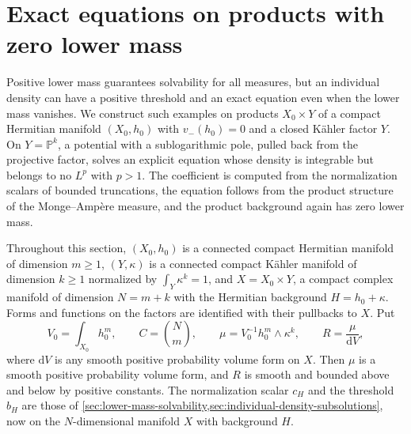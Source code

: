 \section{Exact equations on products with zero lower mass}
\label{sec:zero-lower-mass-product-equations}

Positive lower mass guarantees solvability for all measures, but an individual density can have a positive threshold and an exact equation even when the lower mass vanishes. We construct such examples on products $X_0\times Y$ of a compact Hermitian manifold $(X_0,h_0)$ with $v_-(h_0)=0$ and a closed K\"ahler factor $Y$. On $Y=\mathbb P^k$, a potential with a sublogarithmic pole, pulled back from the projective factor, solves an explicit equation whose density is integrable but belongs to no $L^p$ with $p>1$. The coefficient is computed from the normalization scalars of bounded truncations, the equation follows from the product structure of the Monge--Amp\`ere measure, and the product background again has zero lower mass.

Throughout this section, $(X_0,h_0)$ is a connected compact Hermitian manifold of dimension $m\geq1$, $(Y,\kappa)$ is a connected compact K\"ahler manifold of dimension $k\geq1$ normalized by $\int_Y\kappa^k=1$, and $X=X_0\times Y$, a compact complex manifold of dimension $N=m+k$ with the Hermitian background $H=h_0+\kappa$. Forms and functions on the factors are identified with their pullbacks to $X$. Put
\[
 V_0=\int_{X_0}h_0^m,\qquad C=\binom Nm,\qquad
 \mu=V_0^{-1}h_0^m\wedge\kappa^k,\qquad R=\frac{\mu}{\mathrm{d}V},
\]
where $\mathrm{d}V$ is any smooth positive probability volume form on $X$. Then $\mu$ is a smooth positive probability volume form, and $R$ is smooth and bounded above and below by positive constants. The normalization scalar $c_H$ and the threshold $b_H$ are those of \cref{sec:lower-mass-solvability,sec:individual-density-subsolutions}, now on the $N$-dimensional manifold $X$ with background $H$.

